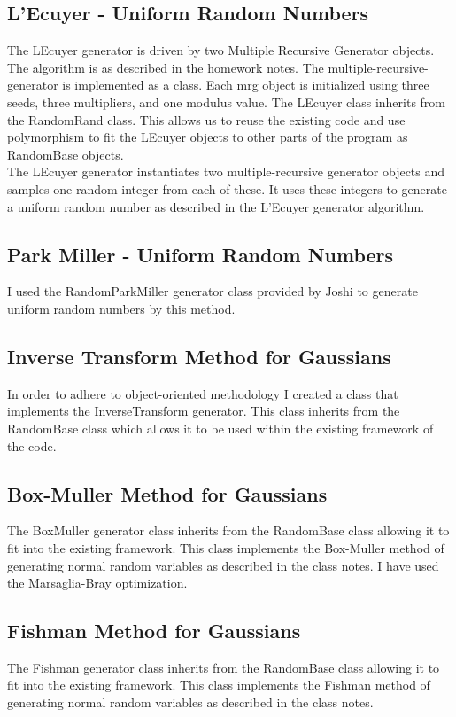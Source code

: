 \documentclass[letterpaper,twoside,11pt,fleqn]{article}
\begin{document}
\subsection*{L'Ecuyer - Uniform Random Numbers}
The LEcuyer generator is driven by two Multiple Recursive Generator objects.  The algorithm is as described in the homework notes.
The multiple-recursive-generator is implemented as a class. Each mrg object is initialized using three seeds, three multipliers, and one modulus value. The LEcuyer class inherits from the RandomRand class. This allows us to reuse the existing code and use polymorphism to fit the LEcuyer objects to other parts of the program as RandomBase objects. \\

The LEcuyer generator instantiates two multiple-recursive generator objects and samples one random integer from each of these. It uses these integers to generate a uniform random number as described in the L'Ecuyer generator algorithm.

\subsection*{Park Miller - Uniform Random Numbers}
I used the RandomParkMiller generator class provided by Joshi to generate uniform random numbers by this method.

\subsection*{Inverse Transform Method for Gaussians}
In order to adhere to object-oriented methodology I created a class that implements the InverseTransform generator. This class inherits from the RandomBase class which allows it to be used within the existing framework of the code.

\subsection*{Box-Muller Method for Gaussians}
The BoxMuller generator class inherits from the RandomBase class allowing it to fit into the existing framework.  This class implements the Box-Muller method of generating normal random variables as described in the class notes.  I have used the Marsaglia-Bray optimization.

\subsection*{Fishman Method for Gaussians}
The Fishman generator class inherits from the RandomBase class allowing it to fit into the existing framework.  This class implements the Fishman method of generating normal random variables as described in the class notes.
\end{document}
